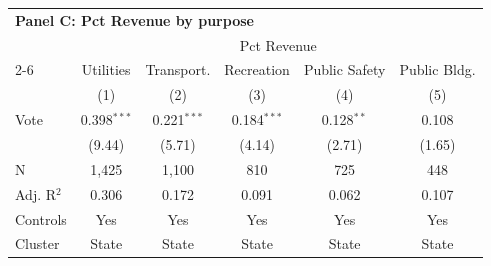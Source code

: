 \begingroup
\centering
\begin{tabular*}{\textwidth}{@{\extracolsep{\fill}}lccccc}
\multicolumn{5}{l}{\textbf{Panel C: Pct Revenue by purpose}}\\

\addlinespace
   \toprule
    & \multicolumn{5}{c}{Pct Revenue}\\
   \cmidrule(lr){2-6}
                  & Utilities     & Transport.    & Recreation    & Public Safety & Public Bldg. \\   
                  & (1)           & (2)           & (3)           & (4)           & (5)\\  
   \midrule 
   Vote           & 0.398$^{***}$ & 0.221$^{***}$ & 0.184$^{***}$ & 0.128$^{**}$  & 0.108\\   
                  & (9.44)       & (5.71)       & (4.14)       & (2.71)       & (1.65)\\   
   \hline
   N   & 1,425         & 1,100         & 810           & 725           & 448\\  
   Adj. R$^2$ & 0.306         & 0.172         & 0.091         & 0.062         & 0.107\\  
   Controls                   & Yes & Yes & Yes & Yes & Yes\\
   Cluster              & State & State & State & State & State\\  
   \bottomrule
\end{tabular*}
\par\endgroup
